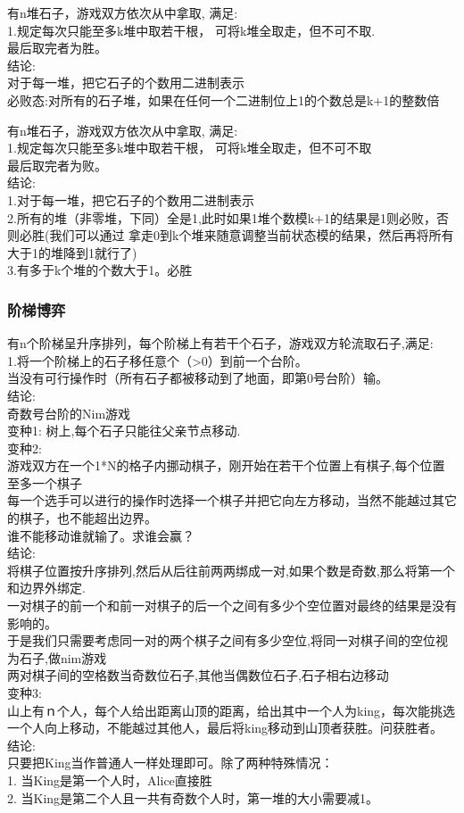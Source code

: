 \documentclass[10pt]{ctexart}
\begin{document}
{{有n堆石子，游戏双方依次从中拿取, 满足:\\
1.规定每次只能至多k堆中取若干根， 可将k堆全取走，但不可不取.\\
最后取完者为胜。\\
结论:\\
对于每一堆，把它石子的个数用二进制表示\\
必败态:对所有的石子堆，如果在任何一个二进制位上1的个数总是k+1的整数倍\\
\par
有n堆石子，游戏双方依次从中拿取, 满足:\\
1.规定每次只能至多k堆中取若干根， 可将k堆全取走，但不可不取\\
最后取完者为败。\\
结论:\\
1.对于每一堆，把它石子的个数用二进制表示\\
2.所有的堆（非零堆，下同）全是1,此时如果1堆个数模k+1的结果是1则必败，否则必胜(我们可以通过 拿走0到k个堆来随意调整当前状态模的结果，然后再将所有大于1的堆降到1就行了)\\
3.有多于k个堆的个数大于1。必胜\\
\subsubsection{阶梯博弈}
有n个阶梯呈升序排列，每个阶梯上有若干个石子，游戏双方轮流取石子,满足:\\
1.将一个阶梯上的石子移任意个（>0）到前一个台阶。\\
当没有可行操作时（所有石子都被移动到了地面，即第0号台阶）输。\\
结论:\\
奇数号台阶的Nim游戏\\
变种1:
树上,每个石子只能往父亲节点移动.\\
变种2:\\
游戏双方在一个1*N的格子内挪动棋子，刚开始在若干个位置上有棋子,每个位置至多一个棋子\\
每一个选手可以进行的操作时选择一个棋子并把它向左方移动，当然不能越过其它的棋子，也不能超出边界。\\
谁不能移动谁就输了。求谁会赢？\\
结论:\\
将棋子位置按升序排列,然后从后往前两两绑成一对,如果个数是奇数,那么将第一个和边界外绑定.\\
一对棋子的前一个和前一对棋子的后一个之间有多少个空位置对最终的结果是没有影响的。\\
于是我们只需要考虑同一对的两个棋子之间有多少空位,将同一对棋子间的空位视为石子,做nim游戏\\
两对棋子间的空格数当奇数位石子,其他当偶数位石子,石子相右边移动\\
变种3:\\
山上有ｎ个人，每个人给出距离山顶的距离，给出其中一个人为king，每次能挑选一个人向上移动，不能越过其他人，最后将king移动到山顶者获胜。问获胜者。\\
结论:\\
只要把King当作普通人一样处理即可。除了两种特殊情况：\\
1. 当King是第一个人时，Alice直接胜\\
2. 当King是第二个人且一共有奇数个人时，第一堆的大小需要减1。\\
}}
\end{document}
